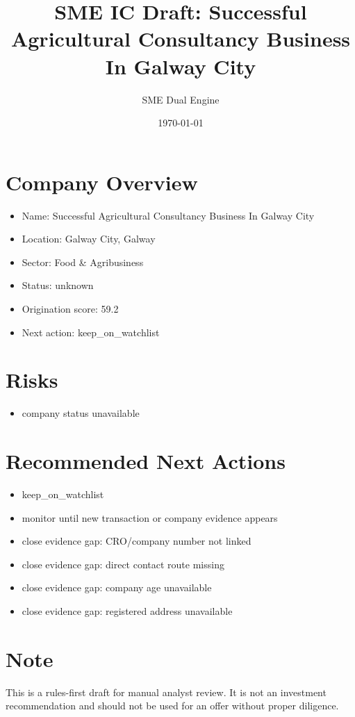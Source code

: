 \documentclass[11pt,a4paper]{article}
\title{SME IC Draft: Successful Agricultural Consultancy Business In Galway City}
\author{SME Dual Engine}
\date{\today}
\begin{document}
\maketitle
\section*{Company Overview}
\begin{itemize}[leftmargin=1.4em]
\item Name: Successful Agricultural Consultancy Business In Galway City
\item Location: Galway City, Galway
\item Sector: Food \& Agribusiness
\item Status: unknown
\item Origination score: 59.2
\item Next action: keep\_on\_watchlist
\end{itemize}
\section*{Risks}
\begin{itemize}[leftmargin=1.4em]
\item company status unavailable
\end{itemize}
\section*{Recommended Next Actions}
\begin{itemize}[leftmargin=1.4em]
\item keep\_on\_watchlist
\item monitor until new transaction or company evidence appears
\item close evidence gap: CRO/company number not linked
\item close evidence gap: direct contact route missing
\item close evidence gap: company age unavailable
\item close evidence gap: registered address unavailable
\end{itemize}
\section*{Note}
This is a rules-first draft for manual analyst review. It is not an investment
recommendation and should not be used for an offer without proper diligence.
\end{document}

